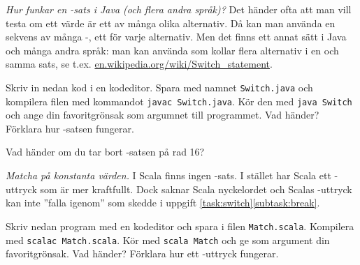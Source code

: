 

\Exercise{\ExeWeekEIGHT}

\begin{Goals}
\item 
\end{Goals}

\begin{Preparations}
\item 
\end{Preparations}

\BasicTasks %

\Task \label{task:switch} \emph{Hur funkar en -sats i Java (och flera andra språk)?} Det händer ofta att man vill testa om ett värde är ett av många olika alternativ. Då kan man använda en sekvens av många -, ett för varje alternativ. Men det finns ett annat sätt i Java och många andra språk: man kan använda  som kollar flera alternativ i en och samma sats, se t.ex. \href{https://en.wikipedia.org/wiki/Switch_statement}{en.wikipedia.org/wiki/Switch\_statement}.

\Subtask Skriv in nedan kod i en kodeditor. Spara med namnet \texttt{Switch.java} och kompilera filen med kommandot \texttt{javac Switch.java}. Kör den med \texttt{java Switch} och ange din favoritgrönsak som argumnet till programmet. Vad händer? Förklara hur -satsen fungerar.


\Subtask \label{subtask:break} Vad händer om du tar bort -satsen på rad 16?




\Task \label{task:vegomatch} \emph{Matcha på konstanta värden.} I Scala finns ingen -sats. I stället har Scala ett -uttryck som är mer kraftfullt. Dock saknar Scala nyckelordet  och Scalas -uttryck kan inte ''falla igenom'' som skedde i uppgift \ref{task:switch}\ref{subtask:break}.

\Subtask \label{subtask:vegomatch} Skriv nedan program med en kodeditor och spara i filen \texttt{Match.scala}. Kompilera med \texttt{scalac Match.scala}. Kör med \texttt{scala Match} och ge som argument din favoritgrönsak. Vad händer? Förklara hur ett -uttryck fungerar.


